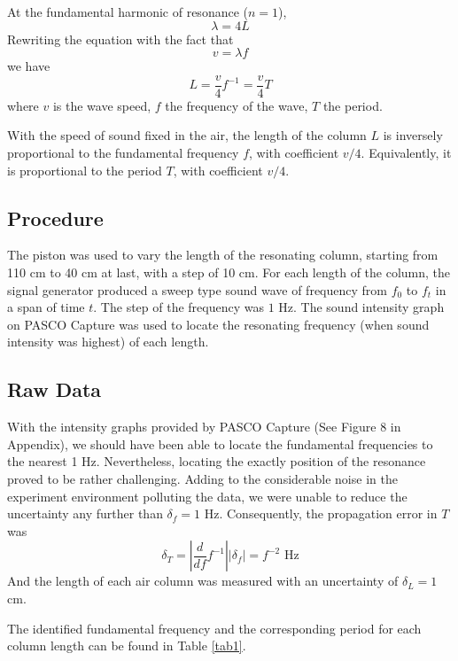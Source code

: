 At the fundamental harmonic of resonance ($n=1$),
$$\lambda=4L$$
Rewriting the equation with the fact that
$$
v = \lambda f
$$
we have
\begin{equation}
L = \frac v4 f^{-1} = \frac v4 T \label{eq:1}
\end{equation}
where $v$ is the wave speed, $f$ the frequency of the wave, $T$ the period.

With the speed of sound fixed in the air, the length of the column $L$ is inversely proportional to the fundamental frequency $f$, with coefficient $v/4.$ Equivalently, it is proportional to the period $T$, with coefficient $v/4.$

\subsection{Procedure}
The piston was used to vary the length of the resonating column, starting from 110 cm to 40 cm at last, with a step of 10 cm. For each length of the column, the signal generator produced a sweep type sound wave of frequency from $f_0$ to $f_t$ in a span of time $t.$ The step of the frequency was $1$ Hz. The sound intensity graph on PASCO Capture was used to locate the resonating frequency (when sound intensity was highest) of each length.


\subsection{Raw Data}

With the intensity graphs provided by PASCO Capture (See Figure 8 in Appendix), we should have been able to locate the fundamental frequencies to the nearest 1 Hz. Nevertheless, locating the exactly position of the resonance proved to be rather challenging. Adding to the considerable noise in the experiment environment polluting the data, we were unable to reduce the uncertainty any further than $\delta_f = 1$ Hz. Consequently, the propagation error in $T$ was
$$
\delta_{T}=|\frac d {df}f^{-1}||\delta_f| = f^{-2} \text{ Hz}
$$
And the length of each air column was measured with an uncertainty of $\delta_L = 1$ cm.

The identified fundamental frequency and the corresponding period for each column length can be found in Table \ref{tab1}.

